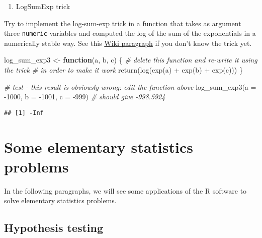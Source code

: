 \documentclass[
  oneside]{book}
\newenvironment{Shaded}{\begin{snugshade}}{\end{snugshade}}
\newcommand{\AttributeTok}[1]{\textcolor[rgb]{0.77,0.63,0.00}{#1}}
\newcommand{\CommentTok}[1]{\textcolor[rgb]{0.56,0.35,0.01}{\textit{#1}}}
\newcommand{\ControlFlowTok}[1]{\textcolor[rgb]{0.13,0.29,0.53}{\textbf{#1}}}
\newcommand{\DecValTok}[1]{\textcolor[rgb]{0.00,0.00,0.81}{#1}}
\newcommand{\FunctionTok}[1]{\textcolor[rgb]{0.00,0.00,0.00}{#1}}
\newcommand{\NormalTok}[1]{#1}
\newcommand{\OtherTok}[1]{\textcolor[rgb]{0.56,0.35,0.01}{#1}}
\newcommand{\SpecialCharTok}[1]{\textcolor[rgb]{0.00,0.00,0.00}{#1}}
\providecommand{\tightlist}{%
  \setlength{\itemsep}{0pt}\setlength{\parskip}{0pt}}
\begin{document}
\begin{enumerate}
\def\labelenumi{\arabic{enumi}.}
\tightlist
\item
  LogSumExp trick
\end{enumerate}

Try to implement the log-sum-exp trick in a function that takes as argument
three \texttt{numeric} variables and computed the log of the sum of the exponentials
in a numerically stable way.
See this
\href{https://en.wikipedia.org/wiki/LogSumExp\#log-sum-exp_trick_for_log-domain_calculations}{Wiki paragraph}
if you don't know the trick yet.

\begin{Shaded}
\begin{Highlighting}[]
\NormalTok{log\_sum\_exp3 }\OtherTok{\textless{}{-}} \ControlFlowTok{function}\NormalTok{(a, b, c) \{}
  \CommentTok{\# delete this function and re{-}write it using the trick}
  \CommentTok{\# in order to make it work}
  \FunctionTok{return}\NormalTok{(}\FunctionTok{log}\NormalTok{(}\FunctionTok{exp}\NormalTok{(a) }\SpecialCharTok{+} \FunctionTok{exp}\NormalTok{(b) }\SpecialCharTok{+} \FunctionTok{exp}\NormalTok{(c)))}
\NormalTok{\}}

\CommentTok{\# test {-} this result is obviously wrong: edit the function above}
\FunctionTok{log\_sum\_exp3}\NormalTok{(}\AttributeTok{a =} \SpecialCharTok{{-}}\DecValTok{1000}\NormalTok{, }\AttributeTok{b =} \SpecialCharTok{{-}}\DecValTok{1001}\NormalTok{, }\AttributeTok{c =} \SpecialCharTok{{-}}\DecValTok{999}\NormalTok{) }\CommentTok{\# should give {-}998.5924}
\end{Highlighting}
\end{Shaded}

\begin{verbatim}
## [1] -Inf
\end{verbatim}

\hypertarget{some-elementary-statistics-problems}{%
\chapter{Some elementary statistics problems}\label{some-elementary-statistics-problems}}

In the following paragraphs, we will see some applications of the R
software to solve elementary statistics problems.

\hypertarget{hypothesis-testing}{%
\section{Hypothesis testing}\label{hypothesis-testing}}
\end{document}

